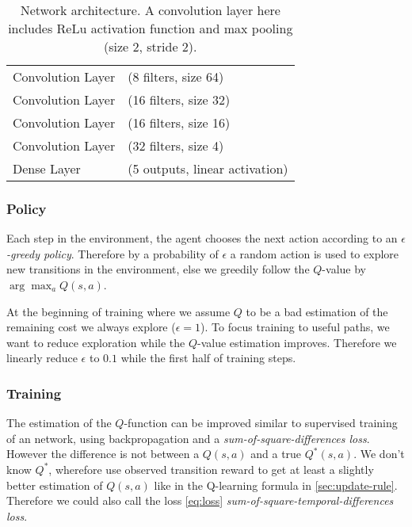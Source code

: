 \documentclass[a4paper,14pt]{article}
\begin{document}
\begin{table}[h]
  \centering
  \begin{tabular}{ll}
    \hline
    Convolution Layer & (8 filters, size 64) \\
    Convolution Layer & (16 filters, size 32) \\
    Convolution Layer & (16 filters, size 16) \\
    Convolution Layer & (32 filters, size 4) \\
    Dense Layer & (5 outputs, linear activation) \\
    \hline
  \end{tabular}
  \caption{Network architecture. A convolution layer here includes ReLu
    activation function and max pooling (size 2, stride 2).}
  \label{tab:architecture}
\end{table}

\subsubsection*{Policy}

Each step in the environment, the agent chooses the next action according to an
$\epsilon$\textit{-greedy policy}.
Therefore by a probability of $\epsilon$ a random action is used to explore new
transitions in the environment, else we greedily follow the
$Q$-value by $\arg \max_a Q(s, a)$.

At the beginning of training where we assume $Q$ to be a bad estimation of the
remaining cost we always explore ($\epsilon = 1$).
To focus training to useful paths, we want to reduce exploration while the
$Q$-value estimation improves.
Therefore we linearly reduce $\epsilon$ to $0.1$ while the first half of
training steps.

\subsubsection*{Training}

The estimation of the $Q$-function can be improved similar to supervised
training of an network, using backpropagation and a
\textit{sum-of-square-differences loss}.
However the difference is not between a $Q(s,a)$ and a true $Q^*(s,a)$.
We don't know $Q^*$, wherefore use observed transition reward to get at least a
slightly better estimation of $Q(s,a)$ like in the Q-learning formula in
\autoref{sec:update-rule}.
Therefore we could also call the loss \autoref{eq:loss} \textit{sum-of-square-temporal-differences
loss}.
\end{document}
